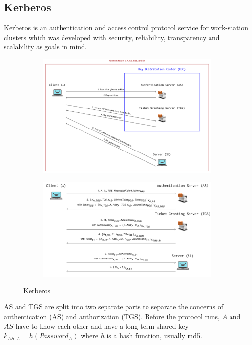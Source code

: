 \subsection{Kerberos}
Kerberos is an authentication and access control protocol service for work-station clusters which was developed with security, reliability, transparency and scalability as goals in mind.
\begin{figure}[H]
\centering
\hspace{50pt}
\begin{subfigure}{.6\textwidth}
  \centering
  \includegraphics[width=\textwidth]{figures/kerberos_concept.png}
\end{subfigure}%
\newline
\begin{subfigure}{.6\textwidth}
  \centering
  \includegraphics[width=\textwidth]{figures/kerberos_details.png}
\end{subfigure}
\caption{Kerberos}\label{fig:kerberos}
\end{figure}
AS and TGS are split into two separate parts to separate the concerns of authentication (AS) and authorization (TGS).
Before the protocol runs, $A$ and $AS$ have to know each other and have a long-term shared key $k_{AS,A} = h(Password_A)$ where $h$ is a hash function, usually md5.

